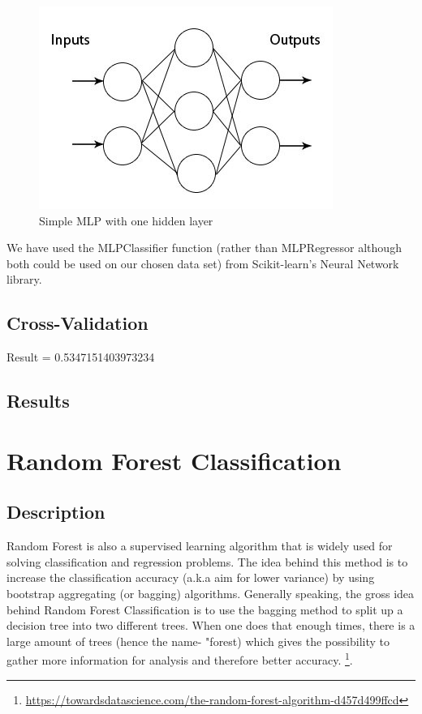 \documentclass[twocolumn]{scrartcl}
\begin{document}
\begin{figure}[h]
	\centering
	\includegraphics[width=\linewidth]{images/mlp.jpeg}
	\caption{Simple MLP with one hidden layer}
	\label{fig:mlp}
\end{figure}

We have used the MLPClassifier function (rather than MLPRegressor although both could be used on our  chosen data set) from Scikit-learn's Neural Network library.

\subsection{Cross-Validation}
Result = 0.5347151403973234
\subsection{Results}

\section{Random Forest Classification}
\subsection{Description}
Random Forest is also a supervised learning algorithm that is widely used for solving classification and regression problems. The idea behind this method is to increase the classification accuracy (a.k.a aim for lower variance) by using bootstrap aggregating (or bagging) algorithms. Generally speaking, the gross idea behind Random Forest Classification is to use the bagging method to split up a decision tree into two different trees. When one does that enough times, there is a large amount of trees (hence the name- "forest) which gives the possibility to gather more information for analysis and therefore better accuracy. \footnote{\url{https://towardsdatascience.com/the-random-forest-algorithm-d457d499ffcd}}.
\end{document}
